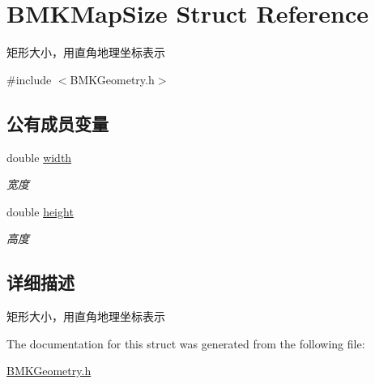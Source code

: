\hypertarget{struct_b_m_k_map_size}{\section{B\-M\-K\-Map\-Size Struct Reference}
\label{struct_b_m_k_map_size}
}


矩形大小，用直角地理坐标表示  




{\ttfamily \#include $<$B\-M\-K\-Geometry.\-h$>$}

\subsection*{公有成员变量}
\begin{DoxyCompactItemize}
\item 
\hypertarget{struct_b_m_k_map_size_a1005d7fd59045a80619c024df3156d6a}{double \hyperlink{struct_b_m_k_map_size_a1005d7fd59045a80619c024df3156d6a}{width}}\label{struct_b_m_k_map_size_a1005d7fd59045a80619c024df3156d6a}

\begin{DoxyCompactList}\small\item\em 宽度 \end{DoxyCompactList}\item 
\hypertarget{struct_b_m_k_map_size_a516baff78187bf8f07ef49f01c7d86fc}{double \hyperlink{struct_b_m_k_map_size_a516baff78187bf8f07ef49f01c7d86fc}{height}}\label{struct_b_m_k_map_size_a516baff78187bf8f07ef49f01c7d86fc}

\begin{DoxyCompactList}\small\item\em 高度 \end{DoxyCompactList}\end{DoxyCompactItemize}


\subsection{详细描述}
矩形大小，用直角地理坐标表示 

The documentation for this struct was generated from the following file\-:\begin{DoxyCompactItemize}
\item 
\hyperlink{_b_m_k_geometry_8h}{B\-M\-K\-Geometry.\-h}\end{DoxyCompactItemize}
